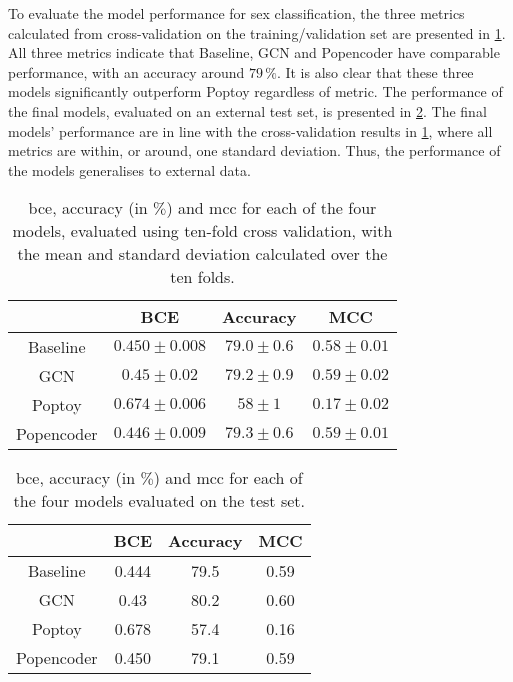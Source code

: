 To evaluate the model performance for sex classification, the three metrics calculated from cross-validation on the training/validation set are presented in \cref{tab:sex_model_results}. All three metrics indicate that Baseline, GCN and Popencoder have comparable performance, with an accuracy around $79\,\%$. It is also clear that these three models significantly outperform Poptoy regardless of metric. The performance of the final models, evaluated on an external test set, is presented in \cref{tab:sex_final_model_results}. The final models' performance are in line with the cross-validation results in \cref{tab:sex_model_results}, where all metrics are within, or around, one standard deviation. Thus, the performance of the models generalises to external data.
\begin{table}[!htbp]
    \centering
    \caption{\acrfull{bce}, accuracy (in $\%$) and \acrfull{mcc} for each of the four models, evaluated using ten-fold cross validation, with the mean and standard deviation calculated over the ten folds.}    
    \begin{tabular}{c|c|c|c}
         & BCE & Accuracy & MCC\\ \hline
        Baseline & $0.450\pm0.008$ & $79.0\pm0.6$ &$0.58\pm 0.01$\\
        GCN &$0.45\pm0.02$ & $79.2\pm0.9$& $0.59\pm0.02$\\
        Poptoy &$0.674\pm 0.006$ & $58\pm1$ &$0.17\pm0.02$\\
        Popencoder &$0.446\pm0.009$& $79.3\pm 0.6$ & $0.59\pm0.01$\\
    \end{tabular}
    \label{tab:sex_model_results}
\end{table}
\begin{table}[!htbp]
    \centering
    \caption{\acrfull{bce}, accuracy (in $\%$) and \acrfull{mcc} for each of the four models evaluated on the test set.}
    \begin{tabular}{c|c|c|c}
         & BCE & Accuracy & MCC\\ \hline
        Baseline & 0.444 & 79.5 &0.59\\
        GCN & 0.43& 80.2 & 0.60 \\
        Poptoy &0.678 &57.4 &0.16\\
        Popencoder & 0.450 & 79.1& 0.59\\
    \end{tabular}
    \label{tab:sex_final_model_results}
\end{table}

